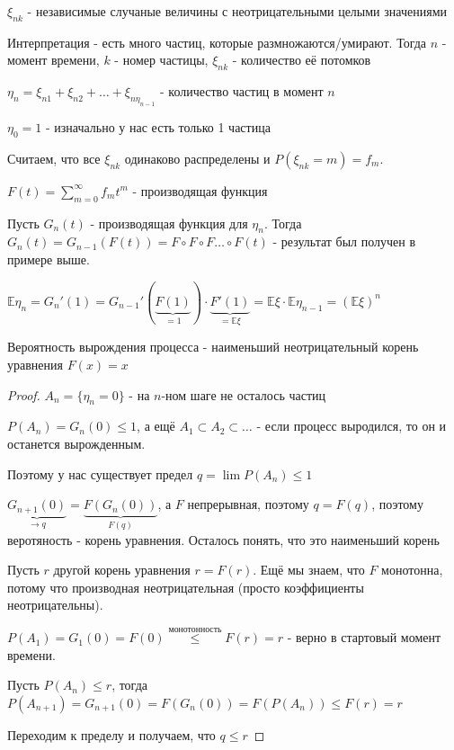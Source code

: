 
$\xi_{nk}$ - независимые случаные величины с неотрицательными целыми значениями

Интерпретация - есть много частиц, которые размножаются/умирают. Тогда $n$ - момент времени, $k$ - номер частицы, $\xi_{nk}$ - количество её потомков

$\eta_n = \xi_{n1} + \xi_{n2} + \ldots + \xi_{n\eta_{n-1}}$ - количество частиц в момент $n$

$\eta_0 = 1$ - изначально у нас есть только 1 частица

Считаем, что все $\xi_{nk}$ одинаково распределены и $P(\xi_{nk} = m) = f_m$. 

$F(t) = \sum\limits_{m=0}^\infty f_m t^m$ - производящая функция

Пусть $G_n (t)$ - производящая функция для $\eta_n$. Тогда $G_n (t) = G_{n-1} (F (t)) = F \circ F \circ F \ldots \circ F (t)$ - результат был получен в примере выше.

$\mathbb{E} \eta_n = G_n' (1) = G_{n-1}' (\underbrace{F(1)}_{=1}) \cdot \underbrace{F' (1)}_{= \mathbb{E} \xi} = \mathbb{E} \xi \cdot \mathbb{E} \eta_{n-1} = (\mathbb{E} \xi)^n$

\begin{theorem}
    Вероятность вырождения процесса - наименьший неотрицательный корень уравнения $F(x) = x$
\end{theorem}

\begin{proof}
    $A_n = \{ \eta_n = 0 \}$ - на $n$-ном шаге не осталось частиц

    $P(A_n) = G_n (0) \leqslant 1$, а ещё $A_1 \subset A_2 \subset \ldots$ - если процесс выродился, то он и останется вырожденным.

    Поэтому у нас существует предел $q = \lim P(A_n) \leqslant 1$

    $\underbrace{G_{n + 1} (0)}_{\rightarrow q} = \underbrace{F(G_n (0))}_{F(q)}$, а $F$ непрерывная, поэтому $q = F(q)$, поэтому веротяность - корень уравнения. Осталось понять, что это
    наименьший корень

    Пусть $r$ другой корень уравнения $r = F(r)$. Ещё мы знаем, что $F$ монотонна, потому что производная неотрицательная (просто коэффициенты неотрицательны).

    $P(A_1) = G_1 (0) = F(0) \overset{\text{монотонность}}{\leqslant} F(r) = r$ - верно в стартовый момент времени.

    Пусть $P(A_n) \leqslant r$, тогда $P(A_{n + 1}) = G_{n + 1} (0) = F(G_n (0))  = F(P(A_n)) \leqslant F(r) = r$

    Переходим к пределу и получаем, что $q \leqslant r$
\end{proof}

